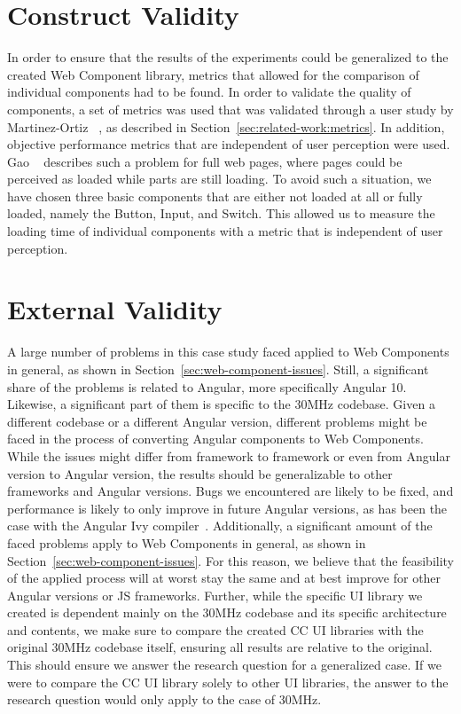 \section{Construct Validity}
In order to ensure that the results of the experiments could be generalized to the created Web Component library, metrics that allowed for the comparison of individual components had to be found. In order to validate the quality of components, a set of metrics was used that was validated through a user study by Martinez-Ortiz \etal{}~\cite{martinez-ortiz2016quality}, as described in Section~\ref{sec:related-work:metrics}. In addition, objective performance metrics that are independent of user perception were used. Gao \etal{}~\cite{gao2017perceived} describes such a problem for full web pages, where pages could be perceived as loaded while parts are still loading. To avoid such a situation, we have chosen three basic components that are either not loaded at all or fully loaded, namely the Button, Input, and Switch. This allowed us to measure the loading time of individual components with a metric that is independent of user perception.

\section{External Validity}
A large number of problems in this case study faced applied to Web Components in general, as shown in Section~\ref{sec:web-component-issues}. Still, a significant share of the problems is related to Angular, more specifically Angular 10. Likewise, a significant part of them is specific to the 30MHz codebase. Given a different codebase or a different Angular version, different problems might be faced in the process of converting Angular components to Web Components. While the issues might differ from framework to framework or even from Angular version to Angular version, the results should be generalizable to other frameworks and Angular versions. Bugs we encountered are likely to be fixed, and performance is likely to only improve in future Angular versions, as has been the case with the Angular Ivy compiler~. Additionally, a significant amount of the faced problems apply to Web Components in general, as shown in Section~\ref{sec:web-component-issues}. For this reason, we believe that the feasibility of the applied process will at worst stay the same and at best improve for other Angular versions or JS frameworks.
Further, while the specific UI library we created is dependent mainly on the 30MHz codebase and its specific architecture and contents, we make sure to compare the created CC UI libraries with the original 30MHz codebase itself, ensuring all results are relative to the original. This should ensure we answer the research question for a generalized case. If we were to compare the CC UI library solely to other UI libraries, the answer to the research question would only apply to the case of 30MHz.